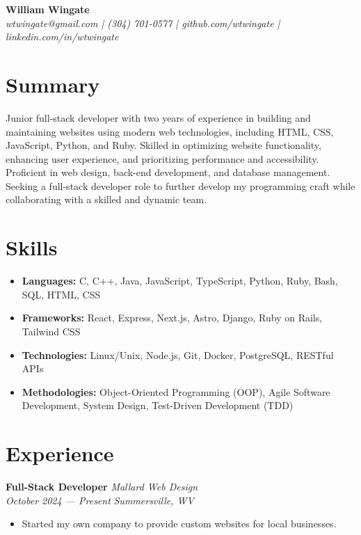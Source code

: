 \documentclass[letterpaper, 11pt]{article}
\begin{document}
\thispagestyle{empty}


\begin{center}
    {\LARGE \textbf{William Wingate}} \\
    \vspace{10pt}
    \textit{wtwingate@gmail.com | (304) 701-0577 | github.com/wtwingate |
    linkedin.com/in/wtwingate}
\end{center}


\section*{Summary}
Junior full-stack developer with two years of experience in building and
maintaining websites using modern web technologies, including HTML, CSS,
JavaScript, Python, and Ruby.  Skilled in optimizing website functionality,
enhancing user experience, and prioritizing performance and accessibility.
Proficient in web design, back-end development, and database management.
Seeking a full-stack developer role to further develop my programming craft
while collaborating with a skilled and dynamic team.


\section*{Skills}
\begin{itemize}
    \item \textbf{Languages:} C, C++, Java, JavaScript, TypeScript, Python,
        Ruby, Bash, SQL, HTML, CSS
    \item \textbf{Frameworks:} React, Express, Next.js, Astro, Django, Ruby on
        Rails, Tailwind CSS
    \item \textbf{Technologies:} Linux/Unix, Node.js, Git, Docker, PostgreSQL,
        RESTful APIs
    \item \textbf{Methodologies:} Object-Oriented Programming (OOP), Agile
        Software Development, System Design, Test-Driven Development (TDD)
\end{itemize}


\section*{Experience}
\textbf{Full-Stack Developer}
\hfill \textit{Mallard Web Design} \\
\textit{October 2024 — Present}
\hfill \textit{Summersville, WV}
\begin{itemize}
    \item Started my own company to provide custom websites for local
        businesses.
\end{itemize}
\end{document}

